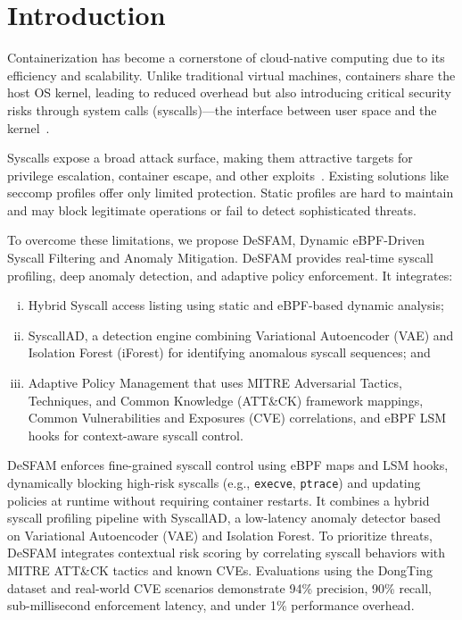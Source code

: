 \section{Introduction}
\label{sec:intro}

Containerization has become a cornerstone of cloud-native computing due to its efficiency and
scalability. Unlike traditional virtual machines, containers share the host OS kernel, leading to
reduced overhead but also introducing critical security risks through system calls
(syscalls)---the interface between user space and the kernel~\cite{ref1_jarkas_survey,ref3_sultan_survey}.

Syscalls expose a broad attack surface, making them attractive targets for privilege escalation,
container escape, and other exploits~\cite{ref5_combe_docker}. Existing solutions like seccomp
profiles offer only limited protection. Static profiles are hard to maintain and may block
legitimate operations or fail to detect sophisticated threats.

To overcome these limitations, we propose DeSFAM, Dynamic eBPF-Driven Syscall Filtering and
Anomaly Mitigation. DeSFAM provides real-time syscall profiling, deep anomaly detection, and
adaptive policy enforcement. It integrates:
\begin{enumerate}[(i)]
  \item Hybrid Syscall access listing using static and eBPF-based dynamic analysis;
  \item SyscallAD, a detection engine combining Variational Autoencoder (VAE) and Isolation
        Forest (iForest) for identifying anomalous syscall sequences; and
  \item Adaptive Policy Management that uses MITRE Adversarial Tactics, Techniques, and Common
        Knowledge (ATT\&CK) framework mappings, Common Vulnerabilities and Exposures (CVE)
        correlations, and eBPF LSM hooks for context-aware syscall control.
\end{enumerate}

DeSFAM enforces fine-grained syscall control using eBPF maps and LSM hooks, dynamically
blocking high-risk syscalls (e.g., \texttt{execve}, \texttt{ptrace}) and updating policies at
runtime without requiring container restarts. It combines a hybrid syscall profiling pipeline
with SyscallAD, a low-latency anomaly detector based on Variational Autoencoder (VAE) and
Isolation Forest. To prioritize threats, DeSFAM integrates contextual risk scoring by
correlating syscall behaviors with MITRE ATT\&CK tactics and known CVEs. Evaluations using the
DongTing dataset and real-world CVE scenarios demonstrate 94\% precision, 90\% recall,
sub-millisecond enforcement latency, and under 1\% performance overhead.

